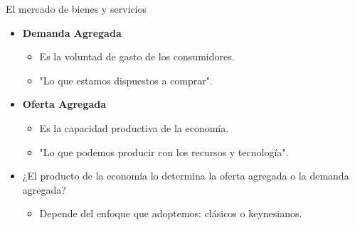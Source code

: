 \documentclass{beamer}
\begin{document}
\begin{frame}{El mercado de bienes y servicios}

\begin{itemize}
    \item \textcolor{blue!80!black}{\textbf{Demanda Agregada}}     {\textcolor{blue!80!black}{\faCartPlus}} \\ \vspace{1mm}
    \begin{itemize}
    \item Es la voluntad de gasto de los consumidores. \vspace{1mm}
    \item "Lo que estamos dispuestos a comprar". 
    \end{itemize} \vspace{4mm}
    \item \textcolor{blue!80!black}{\textbf{Oferta Agregada}}     {\textcolor{blue!80!black}{\faCogs}} \vspace{1mm}
    \begin{itemize}
    \item Es la capacidad productiva de la economía. \vspace{1mm}
    \item "Lo que podemos producir con los recursos y tecnología". 
    \end{itemize}
\end{itemize}

\vspace{4mm}
\begin{itemize}
    \item ¿El producto de la economía lo determina la oferta agregada o la demanda agregada? \vspace{1mm}
    \begin{itemize}
    \item Depende del enfoque que adoptemos: clásicos o keynesianos.
    \end{itemize}
\end{itemize}

\end{frame}
\end{document}

